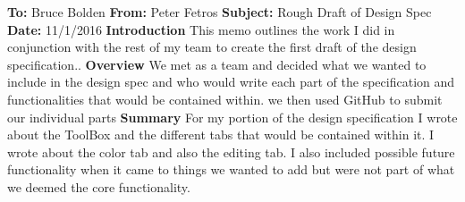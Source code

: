 \documentclass[12pt]{article}
\begin{document}
	\noindent
	\textbf{To:} Bruce Bolden \newline
	\textbf{From:} Peter Fetros \newline
	\textbf{Subject:} Rough Draft of Design Spec \newline
	\textbf{Date:} 11/1/2016 	\newline\newline
	\textbf{Introduction} \newline
	This memo outlines the work I did in conjunction with the rest of my team to create the first draft of the design specification.. \newline\newline
	\textbf{Overview}\newline
	We met as a team and decided what we wanted to include in the design spec and who would write each part of the specification and functionalities that would be contained within. we then used GitHub to submit our individual parts\newline\newline
	\textbf{Summary}\newline
	For my portion of the design specification I wrote about the ToolBox and the different tabs that would be contained within it. I wrote about the color tab and also the editing tab. I also included possible future functionality when it came to things we wanted to add but were not part of what we deemed the core functionality.
\end{document}
